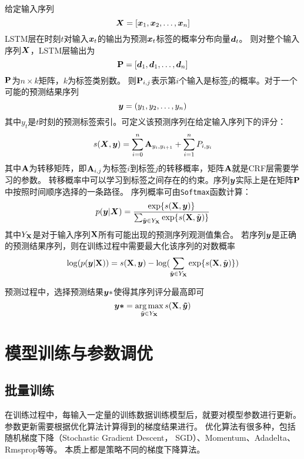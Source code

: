 给定输入序列
\begin{equation}
    \boldsymbol{X} = [\boldsymbol{x}_1, \boldsymbol{x}_2,\dots, \boldsymbol{x}_n]
\end{equation}
LSTM层在时刻$t$对输入$\boldsymbol{x}_t$的输出为预测$\boldsymbol{x}_t$标签的概率分布向量$\boldsymbol{d}_t$。
则对整个输入序列$\boldsymbol{X}$，LSTM层输出为
\begin{equation}
    \boldsymbol{\mathbf{P}} = [\boldsymbol{d}_1,\boldsymbol{d}_1,\dots,\boldsymbol{d}_n]
\end{equation}
$\boldsymbol{\mathbf{P}}$为$n\times k$矩阵，$k$为标签类别数。
则$\boldsymbol{\mathbf{P}}_{i, j}$表示第$i$个输入是标签$j$的概率。对于一个可能的预测结果序列
\begin{equation}
    \boldsymbol{y}=(y_1, y_2,\dots, y_n)
\end{equation}
其中$y_t$是$t$时刻的预测标签索引。可定义该预测序列在给定输入序列下的评分：
\begin{equation}
    s(\boldsymbol{X},\boldsymbol{y})=\sum^n_{i=0}\boldsymbol{\mathbf{A}}_{y_i,y_{i+1}}+\sum^n_{i=1}P_{i, y_i}
\end{equation}
其中$\boldsymbol{\mathbf{A}}$为转移矩阵，即$\boldsymbol{\mathbf{A}}_{i,j}$为标签$i$到标签$j$的转移概率，矩阵$\boldsymbol{\mathbf{A}}$就是CRF层需要学习的参数。
转移概率中可以学习到标签之间存在的约束。序列$\boldsymbol{y}$实际上是在矩阵$\boldsymbol{\mathbf{P}}$中按照时间顺序选择的一条路径。
序列概率可由\verb|Softmax|函数计算：
\begin{equation}
    p(\boldsymbol{y}|\boldsymbol{X})=\frac{\exp\{s(\boldsymbol{\mathbf{X}},\boldsymbol{y})\}}{\sum_{\tilde{\boldsymbol{y}}\in Y_{\boldsymbol{\mathbf{X}}}}\exp\{s(\boldsymbol{\mathbf{X}},\tilde{\boldsymbol{y}})\}}
\end{equation}
其中$Y_{\boldsymbol{\mathbf{X}}}$是对于输入序列$\boldsymbol{\mathbf{X}}$所有可能出现的预测序列观测值集合。
若序列$\boldsymbol{y}$是正确的预测结果序列，则在训练过程中需要最大化该序列的对数概率
\begin{equation}
    \log(p(\boldsymbol{y}|\boldsymbol{\mathbf{X}})) = s(\boldsymbol{\mathbf{X}},\boldsymbol{y})-\log(\sum_{\tilde{\boldsymbol{y}}\in Y_{\boldsymbol{\mathbf{X}}}}\exp\{s(\boldsymbol{\mathbf{X}},\tilde{\boldsymbol{y}})\})
\end{equation}

预测过程中，选择预测结果$\boldsymbol{y}*$使得其序列评分最高即可
\begin{equation}
    \boldsymbol{y*}=\mathop{\arg\max}_{\tilde{\boldsymbol{y}}\in Y_{\boldsymbol{\mathbf{X}}}} s(\boldsymbol{\mathbf{X}},\boldsymbol{\tilde{y}})
\end{equation}
\section{模型训练与参数调优}
\subsection{批量训练}
在训练过程中，每输入一定量的训练数据训练模型后，就要对模型参数进行更新。
参数更新需要根据优化算法计算得到的梯度结果进行。
优化算法有很多种，包括随机梯度下降（Stochastic Gradient Descent， SGD）、Momentum、Adadelta、Rmsprop等等。
本质上都是策略不同的梯度下降算法。

